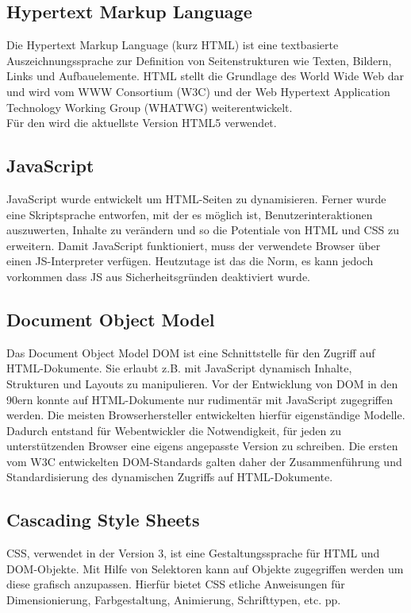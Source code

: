      \subsection{Hypertext Markup Language}
     Die Hypertext Markup Language (kurz HTML) ist eine textbasierte Auszeichnungssprache zur Definition von Seitenstrukturen wie Texten, Bildern, Links und Aufbauelemente. HTML stellt die Grundlage des World Wide Web dar und wird vom WWW Consortium (W3C) und der Web Hypertext Application Technology Working Group (WHATWG) weiterentwickelt.\\
     Für den \getHauptTitel wird die aktuellste Version HTML5 verwendet.
     
     \subsection{JavaScript}
     JavaScript wurde entwickelt um HTML-Seiten zu dynamisieren. Ferner wurde eine Skriptsprache entworfen, mit der es möglich ist, Benutzerinteraktionen auszuwerten, Inhalte zu verändern und so die Potentiale von HTML und CSS zu erweitern. Damit JavaScript funktioniert, muss der verwendete Browser über einen JS-Interpreter verfügen. Heutzutage ist das die Norm, es kann jedoch vorkommen dass JS aus Sicherheitsgründen deaktiviert wurde.
     
     \subsection{Document Object Model}
     Das Document Object Model DOM ist eine Schnittstelle für den Zugriff auf HTML-Dokumente. Sie erlaubt z.B. mit JavaScript dynamisch Inhalte, Strukturen und Layouts zu manipulieren. Vor der Entwicklung von DOM in den 90ern konnte auf HTML-Dokumente nur rudimentär mit JavaScript zugegriffen werden. Die meisten Browserhersteller entwickelten hierfür eigenständige Modelle. Dadurch entstand für Webentwickler die Notwendigkeit, für jeden zu unterstützenden Browser eine eigens angepasste Version zu schreiben. Die ersten vom W3C entwickelten DOM-Standards galten daher der Zusammenführung und Standardisierung des dynamischen Zugriffs auf HTML-Dokumente.
     
     \subsection{Cascading Style Sheets}
     CSS, verwendet in der Version 3, ist eine Gestaltungssprache für HTML und DOM-Objekte. Mit Hilfe von Selektoren kann auf Objekte zugegriffen werden um diese grafisch anzupassen. Hierfür bietet CSS etliche Anweisungen für Dimensionierung, Farbgestaltung, Animierung, Schrifttypen, etc. pp.

